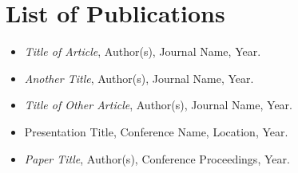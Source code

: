
\chapter*{List of Publications}
\thispagestyle{empty}

\begin{enumerate}[{\bfseries I.}, leftmargin=1cm,itemindent=0em]
    \begin{itemize}
        \item \textit{Title of Article}, Author(s), Journal Name, Year.
        \item \textit{Another Title}, Author(s), Journal Name, Year.
    \end{itemize}

    \begin{itemize}
        \item \textit{Title of Other Article}, Author(s), Journal Name, Year.
    \end{itemize}

    \begin{itemize}
        \item Presentation Title, Conference Name, Location, Year.
    \end{itemize}

    \begin{itemize}
        \item \textit{Paper Title}, Author(s), Conference Proceedings, Year.
    \end{itemize}
\end{enumerate}
